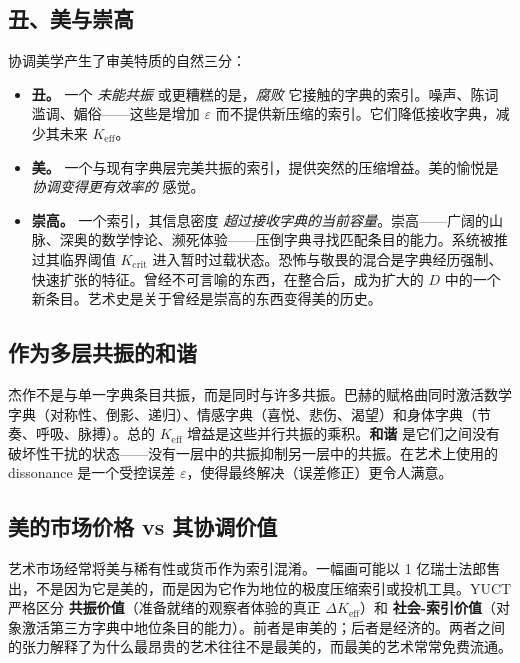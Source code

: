 \documentclass[12pt,a4paper]{article}
\newcommand{\Keff}{K_{\mathrm{eff}}}
\begin{document}
	\subsection{丑、美与崇高}
	
	协调美学产生了审美特质的自然三分：
	
	\begin{itemize}[leftmargin=*]
		\item \textbf{丑。} 一个 \emph{未能共振} 或更糟糕的是，\emph{腐败} 它接触的字典的索引。噪声、陈词滥调、媚俗——这些是增加 \(\varepsilon\) 而不提供新压缩的索引。它们降低接收字典，减少其未来 \(K_{\mathrm{eff}}\)。
		\item \textbf{美。} 一个与现有字典层完美共振的索引，提供突然的压缩增益。美的愉悦是 \emph{协调变得更有效率的} 感觉。
		\item \textbf{崇高。} 一个索引，其信息密度 \emph{超过接收字典的当前容量}。崇高——广阔的山脉、深奥的数学悖论、濒死体验——压倒字典寻找匹配条目的能力。系统被推过其临界阈值 \(K_{\mathrm{crit}}\) 进入暂时过载状态。恐怖与敬畏的混合是字典经历强制、快速扩张的特征。曾经不可言喻的东西，在整合后，成为扩大的 \(D\) 中的一个新条目。艺术史是关于曾经是崇高的东西变得美的历史。
	\end{itemize}
	
	\subsection{作为多层共振的和谐}
	
	杰作不是与单一字典条目共振，而是同时与许多共振。巴赫的赋格曲同时激活数学字典（对称性、倒影、递归）、情感字典（喜悦、悲伤、渴望）和身体字典（节奏、呼吸、脉搏）。总的 \(K_{\mathrm{eff}}\) 增益是这些并行共振的乘积。\textbf{和谐} 是它们之间没有破坏性干扰的状态——没有一层中的共振抑制另一层中的共振。在艺术上使用的 dissonance 是一个受控误差 \(\varepsilon\)，使得最终解决（误差修正）更令人满意。
	
	\subsection{美的市场价格 vs 其协调价值}
	
	艺术市场经常将美与稀有性或货币作为索引混淆。一幅画可能以 1 亿瑞士法郎售出，不是因为它是美的，而是因为它作为地位的极度压缩索引或投机工具。YUCT 严格区分 \textbf{共振价值}（准备就绪的观察者体验的真正 \(\Delta\Keff\)）和 \textbf{社会-索引价值}（对象激活第三方字典中地位条目的能力）。前者是审美的；后者是经济的。两者之间的张力解释了为什么最昂贵的艺术往往不是最美的，而最美的艺术常常免费流通。
	
\end{document}
